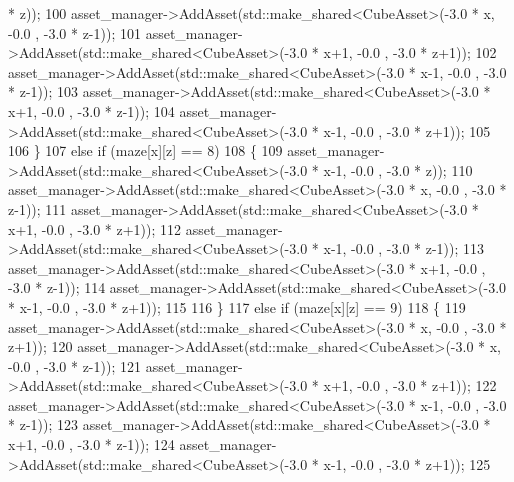 \begin{DoxyCode}
       * z));
100                                 asset\_manager->AddAsset(std::make\_shared<CubeAsset>(-3.0 * x,   -0.0 , -3.0
       * z-1)); 
101                                 asset\_manager->AddAsset(std::make\_shared<CubeAsset>(-3.0 * x+1, -0.0 , -3.0
       * z+1)); 
102                                 asset\_manager->AddAsset(std::make\_shared<CubeAsset>(-3.0 * x-1, -0.0 , -3.0
       * z-1)); 
103                                 asset\_manager->AddAsset(std::make\_shared<CubeAsset>(-3.0 * x+1, -0.0 , -3.0
       * z-1)); 
104                                 asset\_manager->AddAsset(std::make\_shared<CubeAsset>(-3.0 * x-1, -0.0 , -3.0
       * z+1)); 
105 
106                             \}
107                         \textcolor{keywordflow}{else} \textcolor{keywordflow}{if} (maze[x][z] == 8)
108                             \{       
109                                 asset\_manager->AddAsset(std::make\_shared<CubeAsset>(-3.0 * x-1, -0.0 , -3.0
       * z));
110                                 asset\_manager->AddAsset(std::make\_shared<CubeAsset>(-3.0 * x,   -0.0 , -3.0
       * z-1));
111                                 asset\_manager->AddAsset(std::make\_shared<CubeAsset>(-3.0 * x+1, -0.0 , -3.0
       * z+1));
112                                 asset\_manager->AddAsset(std::make\_shared<CubeAsset>(-3.0 * x-1, -0.0 , -3.0
       * z-1));
113                                 asset\_manager->AddAsset(std::make\_shared<CubeAsset>(-3.0 * x+1, -0.0 , -3.0
       * z-1));
114                                 asset\_manager->AddAsset(std::make\_shared<CubeAsset>(-3.0 * x-1, -0.0 , -3.0
       * z+1));
115 
116                             \}
117                         \textcolor{keywordflow}{else} \textcolor{keywordflow}{if} (maze[x][z] == 9)
118                             \{   
119                                 asset\_manager->AddAsset(std::make\_shared<CubeAsset>(-3.0 * x,   -0.0 , -3.0
       * z+1));
120                                 asset\_manager->AddAsset(std::make\_shared<CubeAsset>(-3.0 * x,   -0.0 , -3.0
       * z-1));
121                                 asset\_manager->AddAsset(std::make\_shared<CubeAsset>(-3.0 * x+1, -0.0 , -3.0
       * z+1));
122                                 asset\_manager->AddAsset(std::make\_shared<CubeAsset>(-3.0 * x-1, -0.0 , -3.0
       * z-1));
123                                 asset\_manager->AddAsset(std::make\_shared<CubeAsset>(-3.0 * x+1, -0.0 , -3.0
       * z-1));
124                                 asset\_manager->AddAsset(std::make\_shared<CubeAsset>(-3.0 * x-1, -0.0 , -3.0
       * z+1));
125 

\end{DoxyCode}
